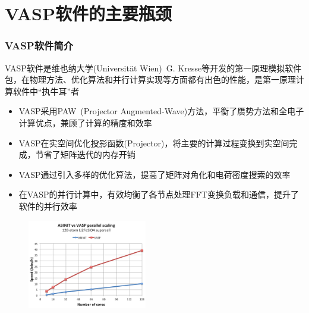 \section{\rm{VASP}软件的主要瓶颈}
\frame
{
	\frametitle{\textrm{VASP}软件简介}
	\textrm{VASP}软件是维也纳大学\textrm{(Universit\"at Wien)}~\textrm{G. Kresse}等开发的第一原理模拟软件包，在物理方法、优化算法和并行计算实现等方面都有出色的性能，是第一原理计算软件中``执牛耳''者
	\begin{itemize}
\fontsize{7.2pt}{5.2pt}\selectfont
		\item \textrm{VASP}采用\textrm{PAW~(Projector Augmented-Wave)}方法，平衡了赝势方法和全电子计算优点，兼顾了计算的精度和效率
		\item \textrm{VASP}在实空间优化投影函数\textrm{(Projector)}，将主要的计算过程变换到实空间完成，节省了矩阵迭代的内存开销%
		\item \textrm{VASP}通过引入多样的优化算法，提高了矩阵对角化和电荷密度搜索的效率
		\item 在\textrm{VASP}的并行计算中，有效均衡了各节点处理\textrm{FFT}变换负载和通信，提升了软件的并行效率
	\end{itemize}
\begin{figure}[h!]
	\vspace{-0.25in}
\centering
\includegraphics[height=1.55in,width=2.05in,viewport=0 0 240 200,clip]{Figures/VASP-abinit_Li128-2.png}
\label{ABINIT_vs_VASP-1}
\end{figure} 
}

%

